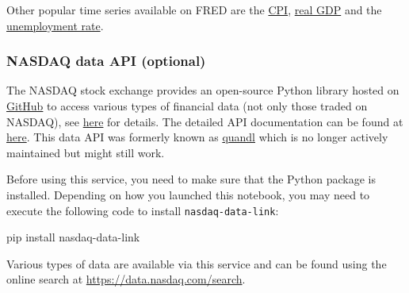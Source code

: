 \documentclass{scrartcl}
\newenvironment{Shaded}{}{}
\newcommand{\NormalTok}[1]{{#1}}
\newcommand{\ExtensionTok}[1]{{#1}}
\begin{document}
    \begin{center}
    \end{center}
    
    Other popular time series available on FRED are the
\href{https://fred.stlouisfed.org/series/CPIAUCSL}{CPI},
\href{https://fred.stlouisfed.org/series/GDPC1}{real GDP} and the
\href{https://fred.stlouisfed.org/series/UNRATE}{unemployment rate}.

    \hypertarget{nasdaq-data-api-optional}{%
\subsubsection{NASDAQ data API
(optional)}\label{nasdaq-data-api-optional}}

The NASDAQ stock exchange provides an open-source Python library hosted
on \href{https://github.com/Nasdaq/data-link-python}{GitHub} to access
various types of financial data (not only those traded on NASDAQ), see
\href{https://data.nasdaq.com/}{here} for details. The detailed API
documentation can be found at
\href{https://docs.data.nasdaq.com/docs}{here}. This data API was
formerly known as \href{https://github.com/quandl/quandl-python}{quandl}
which is no longer actively maintained but might still work.

Before using this service, you need to make sure that the Python package
is installed. Depending on how you launched this notebook, you may need
to execute the following code to install \texttt{nasdaq-data-link}:

\begin{Shaded}
\begin{Highlighting}[]
\ExtensionTok{pip}\NormalTok{ install nasdaq{-}data{-}link}
\end{Highlighting}
\end{Shaded}

Various types of data are available via this service and can be found
using the online search at \url{https://data.nasdaq.com/search}.
\end{document}
